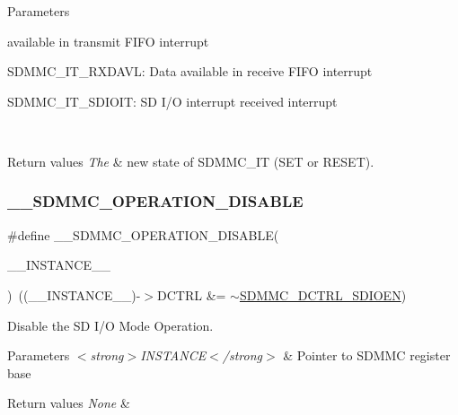 \begin{DoxyParams}{Parameters}
\begin{DoxyItemize}
available in transmit F\+I\+FO interrupt \item S\+D\+M\+M\+C\+\_\+\+I\+T\+\_\+\+R\+X\+D\+A\+VL\+: Data available in receive F\+I\+FO interrupt \item S\+D\+M\+M\+C\+\_\+\+I\+T\+\_\+\+S\+D\+I\+O\+IT\+: SD I/O interrupt received interrupt \end{DoxyItemize}
\\
\hline
\end{DoxyParams}

\begin{DoxyRetVals}{Return values}
{\em The} & new state of S\+D\+M\+M\+C\+\_\+\+IT (S\+ET or R\+E\+S\+ET). \\
\hline
\end{DoxyRetVals}
\mbox{\label{group___s_d_m_m_c___l_l___interrupt___clock_gab72fdd2401a780492474349fd45592d1}} 
\subsubsection{\texorpdfstring{\_\_SDMMC\_OPERATION\_DISABLE}{\_\_SDMMC\_OPERATION\_DISABLE}}
{\footnotesize\ttfamily \#define \+\_\+\+\_\+\+S\+D\+M\+M\+C\+\_\+\+O\+P\+E\+R\+A\+T\+I\+O\+N\+\_\+\+D\+I\+S\+A\+B\+LE(\begin{DoxyParamCaption}\item[{}]{\+\_\+\+\_\+\+I\+N\+S\+T\+A\+N\+C\+E\+\_\+\+\_\+ }\end{DoxyParamCaption})~((\+\_\+\+\_\+\+I\+N\+S\+T\+A\+N\+C\+E\+\_\+\+\_\+)-\/$>$D\+C\+T\+RL \&= $\sim$\mbox{\hyperlink{group___peripheral___registers___bits___definition_gab66312264da16d4693a3c9a9cba33c9e}{S\+D\+M\+M\+C\+\_\+\+D\+C\+T\+R\+L\+\_\+\+S\+D\+I\+O\+EN}})}



Disable the SD I/O Mode Operation. 


\begin{DoxyParams}{Parameters}
{\em $<$strong$>$\+I\+N\+S\+T\+A\+N\+C\+E$<$/strong$>$} & Pointer to S\+D\+M\+MC register base \\
\hline
\end{DoxyParams}

\begin{DoxyRetVals}{Return values}
{\em None} & \\
\hline
\end{DoxyRetVals}
\mbox{\label{group___s_d_m_m_c___l_l___interrupt___clock_gae827e25ed818df7dcd6110a16b72caec}} 
